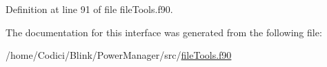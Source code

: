 Definition at line 91 of file file\-Tools.\-f90.



The documentation for this interface was generated from the following file\-:\begin{DoxyCompactItemize}
\item 
/home/\-Codici/\-Blink/\-Power\-Manager/src/\hyperlink{file_tools_8f90}{file\-Tools.\-f90}\end{DoxyCompactItemize}
